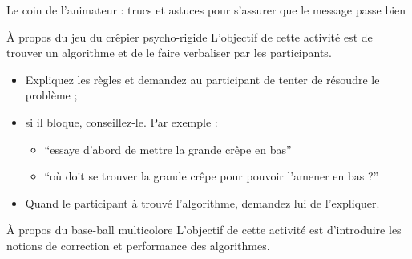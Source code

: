 \begin{frame}{Le coin de l'animateur : trucs et astuces pour s'assurer que le message passe bien}
  \begin{block}{À propos du jeu du crêpier psycho-rigide}
    L'objectif de cette activité est de trouver un algorithme et de le faire verbaliser par les participants.

    \begin{itemize}
    \item Expliquez les règles et demandez au participant de tenter de résoudre le problème ;
    \item si il bloque, conseillez-le. Par exemple :
      \begin{itemize}
        \item ``essaye d'abord de mettre la grande crêpe en bas''
        \item ``où doit se trouver la grande crêpe pour pouvoir l'amener en bas ?''
      \end{itemize}
    \item Quand le participant à trouvé l'algorithme, demandez lui de l'expliquer. 
    \end{itemize}
  \end{block}

  \begin{block}{À propos du base-ball multicolore}
    L'objectif de cette activité est d'introduire les notions de correction et performance des algorithmes.


\end{block}
\end{frame}
